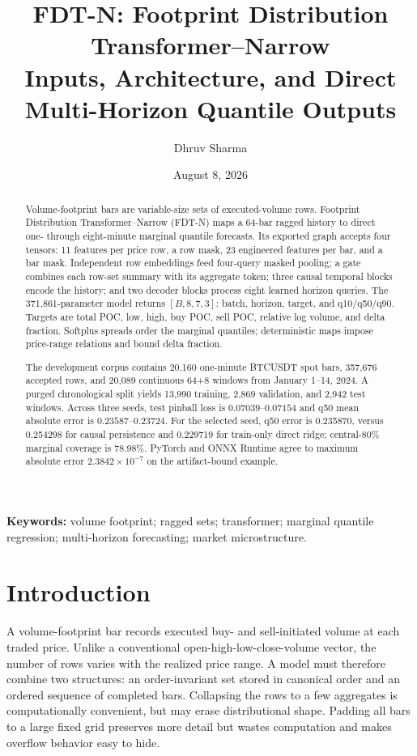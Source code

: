 \documentclass[10pt]{article}
\title{\vspace{-0.8em}\bfseries FDT-N: Footprint Distribution Transformer--Narrow\\[0.2em]
\large Inputs, Architecture, and Direct Multi-Horizon Quantile Outputs}
\author{Dhruv Sharma}
\affil{Independent Researcher\\texttt{dhruvsha.info@gmail.com}}
\date{August 8, 2026}
\begin{document}
\maketitle
\vspace{-1.5em}

\begin{abstract}
\noindent Volume-footprint bars are variable-size sets of executed-volume rows. Footprint Distribution
Transformer--Narrow (FDT-N) maps a 64-bar ragged history to direct one- through eight-minute marginal
quantile forecasts. Its exported graph accepts four tensors: 11 features per price row, a row mask,
23 engineered features per bar, and a bar mask. Independent row embeddings feed four-query masked pooling; a
gate combines each row-set summary with its aggregate token; three causal temporal blocks encode the
history; and two decoder blocks process eight learned horizon queries. The 371,861-parameter model
returns $[B,8,7,3]$: batch, horizon, target, and q10/q50/q90. Targets are total POC, low, high, buy POC,
sell POC, relative log volume, and delta fraction. Softplus spreads order the marginal quantiles;
deterministic maps impose price-range relations and bound delta fraction.

The development corpus contains 20,160 one-minute BTCUSDT spot bars, 357,676 accepted rows, and 20,089
continuous 64+8 windows from January 1--14, 2024. A purged chronological split yields 13,990 training,
2,869 validation, and 2,942 test windows. Across three seeds, test pinball loss is
$0.07039$--$0.07154$ and q50 mean absolute error is $0.23587$--$0.23724$. For the selected seed, q50
error is 0.235870, versus 0.254298 for causal persistence and 0.229719 for train-only direct ridge;
central-80\% marginal coverage is 78.98\%. PyTorch and ONNX Runtime agree to maximum absolute error
$2.3842\times10^{-7}$ on the artifact-bound example.
\end{abstract}

\noindent\textbf{Keywords:} volume footprint; ragged sets; transformer; marginal quantile regression;
multi-horizon forecasting; market microstructure.

\section{Introduction}

A volume-footprint bar records executed buy- and sell-initiated volume at each traded price. Unlike
a conventional open-high-low-close-volume vector, the number of rows varies with the realized price
range. A model must therefore combine two structures: an order-invariant set stored in canonical
order and an ordered sequence of completed bars. Collapsing the rows to a few
aggregates is computationally convenient, but may erase distributional shape. Padding all bars to a
large fixed grid preserves more detail but wastes computation and makes overflow behavior easy to
hide.
\end{document}

